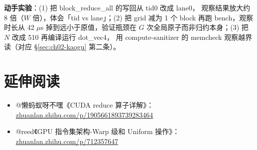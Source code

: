 \textbf{动手实验}：(1) 把 block\_reduce\_all 的写回从 tid0 改成 lane0，
观察结果放大约 8 倍（$W$ 倍），体会「tid vs lane」；(2) 把 grid 减为 1 个
block 再跑 bench，观察时长从 42 $\mu$s 掉到远小于原值，验证瓶颈在
$G$ 次全局原子而非归约本身；(3) 把 $N$ 改成 510 再编译运行 dot\_vec4，
用 compute-sanitizer 的 memcheck 观察越界读（对应
\S\ref{sec:ch02-kaogu} 第二条）。

\section*{延伸阅读}
\begin{itemize}
\item @懒蚂蚁呀不嘿《CUDA reduce 算子详解》：
  \href{https://zhuanlan.zhihu.com/p/1905661893739283464}{zhuanlan.zhihu.com/p/1905661893739283464}
\item @reed《GPU 指令集架构-Warp 级和 Uniform 操作》：
  \href{https://zhuanlan.zhihu.com/p/712357647}{zhuanlan.zhihu.com/p/712357647}
\end{itemize}
